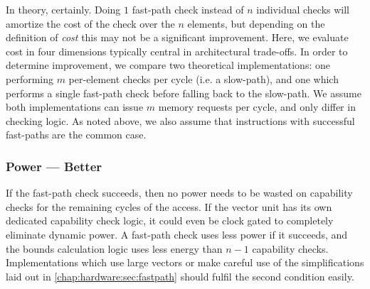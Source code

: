 
In theory, certainly.
Doing $1$ fast-path check instead of $n$ individual checks will amortize the cost of the check over the $n$ elements, but depending on the definition of \emph{cost} this may not be a significant improvement.
Here, we evaluate cost in four dimensions typically central in architectural trade-offs.
In order to determine improvement, we compare two theoretical implementations: one performing $m$ per-element checks per cycle (i.e. a slow-path), and one which performs a single fast-path check before falling back to the slow-path.
We assume both implementations can issue $m$ memory requests per cycle, and only differ in checking logic.
As noted above, we also assume that instructions with successful fast-paths are the common case.


\subsubsection*{Power --- Better}
If the fast-path check succeeds, then no power needs to be wasted on capability checks for the remaining cycles of the access.
If the vector unit has its own dedicated capability check logic, it could even be clock gated to completely eliminate dynamic power.
A fast-path check uses less power if it succeeds, and the bounds calculation logic uses less energy than $n - 1$ capability checks.
Implementations which use large vectors or make careful use of the simplifications laid out in \cref{chap:hardware:sec:fastpath} should fulfil the second condition easily.

